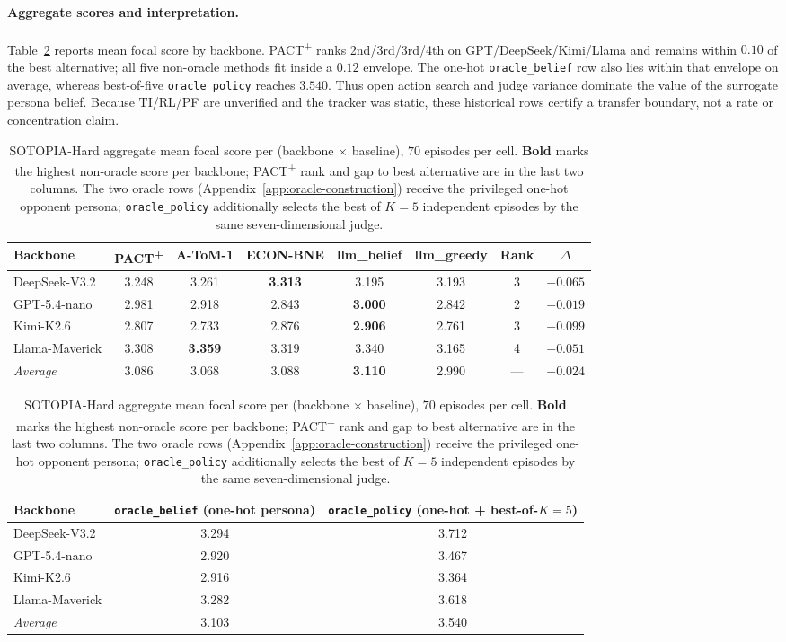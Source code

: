 \paragraph{Aggregate scores and interpretation.} Table~\ref{tab:sotopia-aggregate} reports mean focal score by backbone. PACT\textsuperscript{+} ranks 2nd/3rd/3rd/4th on GPT/DeepSeek/Kimi/Llama and remains within $0.10$ of the best alternative; all five non-oracle methods fit inside a $0.12$ envelope. The one-hot \texttt{oracle\_belief} row also lies within that envelope on average, whereas best-of-five \texttt{oracle\_policy} reaches $3.540$. Thus open action search and judge variance dominate the value of the surrogate persona belief. Because TI/RL/PF are unverified and the tracker was static, these historical rows certify a transfer boundary, not a rate or concentration claim.

\begin{table}[h]
\centering\small
\caption{SOTOPIA-Hard aggregate mean focal score per (backbone $\times$ baseline), $70$ episodes per cell. \textbf{Bold} marks the highest non-oracle score per backbone; PACT\textsuperscript{+} rank and gap to best alternative are in the last two columns. The two oracle rows (Appendix~\ref{app:oracle-construction}) receive the privileged one-hot opponent persona; \texttt{oracle\_policy} additionally selects the best of $K{=}5$ independent episodes by the same seven-dimensional judge.}
\label{tab:sotopia-aggregate}
\begin{tabular}{lccccccc}
\toprule
Backbone & PACT\textsuperscript{+} & A-ToM-1 & ECON-BNE & llm\_belief & llm\_greedy & Rank & $\Delta$ \\
\midrule
DeepSeek-V3.2 & 3.248 & 3.261 & \textbf{3.313} & 3.195 & 3.193 & 3 & $-0.065$ \\
GPT-5.4-nano & 2.981 & 2.918 & 2.843 & \textbf{3.000} & 2.842 & 2 & $-0.019$ \\
Kimi-K2.6 & 2.807 & 2.733 & 2.876 & \textbf{2.906} & 2.761 & 3 & $-0.099$ \\
Llama-Maverick & 3.308 & \textbf{3.359} & 3.319 & 3.340 & 3.165 & 4 & $-0.051$ \\
\midrule
\emph{Average} & 3.086 & 3.068 & 3.088 & \textbf{3.110} & 2.990 & --- & $-0.024$ \\
\bottomrule
\end{tabular}

\vspace{4pt}
\begin{tabular}{lcc}
\toprule
Backbone & \texttt{oracle\_belief} (one-hot persona) & \texttt{oracle\_policy} (one-hot + best-of-$K{=}5$) \\
\midrule
DeepSeek-V3.2 & 3.294 & 3.712 \\
GPT-5.4-nano  & 2.920 & 3.467 \\
Kimi-K2.6     & 2.916 & 3.364 \\
Llama-Maverick & 3.282 & 3.618 \\
\midrule
\emph{Average} & 3.103 & 3.540 \\
\bottomrule
\end{tabular}
\end{table}


